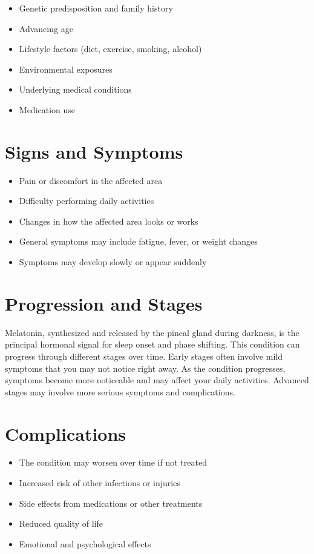 \begin{itemize}[noitemsep]
  \item Genetic predisposition and family history
  \item Advancing age
  \item Lifestyle factors (diet, exercise, smoking, alcohol)
  \item Environmental exposures
  \item Underlying medical conditions
  \item Medication use
\end{itemize}

\section{Signs and Symptoms}

\begin{itemize}[noitemsep]
  \item Pain or discomfort in the affected area
  \item Difficulty performing daily activities
  \item Changes in how the affected area looks or works
  \item General symptoms may include fatigue, fever, or weight changes
  \item Symptoms may develop slowly or appear suddenly
\end{itemize}

\section{Progression and Stages}
Melatonin, synthesized and released by the pineal gland during darkness, is the principal hormonal signal for sleep onset and phase shifting. This condition can progress through different stages over time. Early stages often involve mild symptoms that you may not notice right away. As the condition progresses, symptoms become more noticeable and may affect your daily activities. Advanced stages may involve more serious symptoms and complications.

\section{Complications}

\begin{itemize}[noitemsep]
  \item The condition may worsen over time if not treated
  \item Increased risk of other infections or injuries
  \item Side effects from medications or other treatments
  \item Reduced quality of life
  \item Emotional and psychological effects
\end{itemize}

